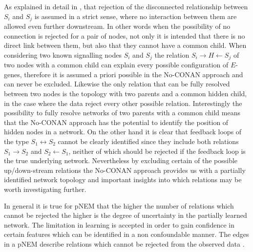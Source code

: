  As explained in detail in \cite{art:SadehMS2013}, that rejection of the disconnected relationship between $S_i$ and $S_j$ is assumed in a strict sense, where no interaction between them are allowed even further downstream. In other words when the possibility of no connection is rejected for a pair of nodes, not only it is intended that there is no direct link between them, but also that they cannot have a common child. When considering two known signalling nodes $S_i$ and $S_j$ the relation $S_i \rightarrow H \leftarrow S_j$ of two nodes with a common child can explain every possible configuration of $E$-genes, therefore it is assumed a priori possible in the No-CONAN approach and can never be excluded. Likewise the only relation that can be fully resolved between two nodes is the topology with two parents and a common hidden child, in the case where the data reject every other possible relation. Interestingly the possibility to fully resolve networks of two parents with a common child means that the No-CONAN approach has the potential to identify the position of hidden nodes in a network. On the other hand it is clear that feedback loops of the type $S_1 \leftrightarrow S_2$ cannot be clearly identified since they include both relations $S_1 \rightarrow S_2$ and  $S_2 \leftarrow S_1$, neither of which should be rejected if the feedback loop is the true underlying network. Nevertheless by excluding certain of the possible up/down-stream relations the No-CONAN approach provides us with a partially identified network topology  and important insights into which relations may be worth investigating further.

In general it is true for pNEM that the higher the number of relations which cannot be rejected the higher is the degree of uncertainty in the partially learned network. The limitation in learning is accepted in order to gain confidence in certain features which can be identified in a non confoundable manner. The edges in a pNEM describe relations which cannot be rejected from the observed data \citep{art:SadehMS2013}.

